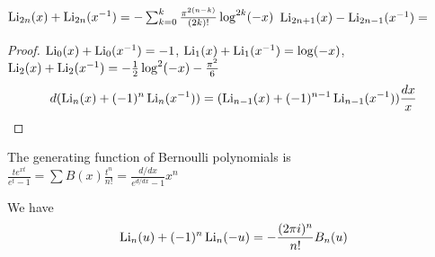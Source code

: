 \documentclass[main]{subfiles}
\begin{document}
\begin{theorem}
$\operatorname{Li}_{2n}(x)+\operatorname{Li}_{2n}(x^{-1})=-\sum_{k=0}^k\frac{\pi^{2(n-k)}}{(2k)!}\log^{2k}(-x)$
$\operatorname{Li}_{2n+1}(x)-\operatorname{Li}_{2n-1}(x^{-1})=$
\end{theorem}

\begin{proof}
$\operatorname{Li}_0(x)+\operatorname{Li}_0(x^{-1})=-1$, $\operatorname{Li}_1(x)+\operatorname{Li}_1(x^{-1})=\log(-x)$, $\operatorname{Li}_2(x)+\operatorname{Li}_2(x^{-1})=-\frac{1}{2}\log^2(-x)-\frac{\pi^2}{6}$
\[d(\operatorname{Li}_n(x)+(-1)^{n}\operatorname{Li}_n(x^{-1}))=(\operatorname{Li}_{n-1}(x)+(-1)^{n-1}\operatorname{Li}_{n-1}(x^{-1}))\frac{dx}{x}\]
\end{proof}


\begin{definition}
The generating function of Bernoulli polynomials is $\frac{te^{xt}}{e^t-1}=\sum B(x)\frac{t^n}{n!}=\frac{d/dx}{e^{d/dx}-1}x^n$
\end{definition}

We have
\[\operatorname{Li}_n(u)+(-1)^n\operatorname{Li}_n(-u)=-\frac{(2\pi i)^n}{n!}B_n(u)\]
\end{document}
